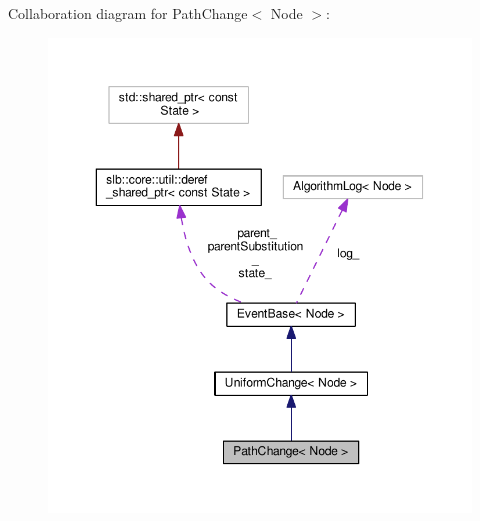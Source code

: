 Collaboration diagram for Path\+Change$<$ Node $>$\+:\nopagebreak
\begin{figure}[H]
\begin{center}
\leavevmode
\includegraphics[width=350pt]{structPathChange__coll__graph}
\end{center}
\end{figure}

